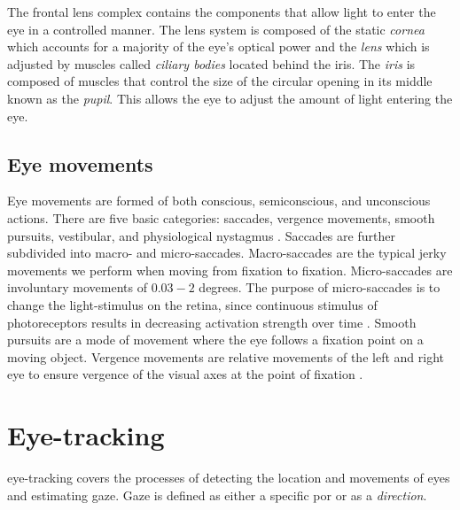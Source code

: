 The frontal lens complex contains the components that allow light to enter the eye in a controlled manner. The lens system is composed of the static \emph{cornea} which accounts for a majority of the eye's optical power and the \emph{lens} which is adjusted by muscles called \emph{ciliary bodies} located behind the iris. The \emph{iris} is composed of muscles that control the size of the circular opening in its middle known as the \emph{pupil}. This allows the eye to adjust the amount of light entering the eye. 

\subsection{Eye movements}
Eye movements are formed of both conscious, semiconscious, and unconscious actions. There are five basic categories: saccades, vergence movements, smooth pursuits, vestibular, and physiological nystagmus \parencite[39]{methodology}. Saccades are further subdivided into macro- and micro-saccades. Macro-saccades are the typical jerky movements we perform when moving from fixation to fixation. Micro-saccades are involuntary movements of $0.03-2$ degrees. The purpose of micro-saccades is to change the light-stimulus on the retina, since continuous stimulus of photoreceptors results in decreasing activation strength over time \parencite[44]{methodology}. Smooth pursuits are a mode of movement where the eye follows a fixation point on a moving object. Vergence movements are relative movements of the left and right eye to ensure vergence of the visual axes at the point of fixation \parencite{methodology}.


\section{Eye-tracking}\label{sec:eye-tracking}
\Gls{eye-tracking} covers the processes of detecting the location and movements of eyes and estimating \gls{gaze}. Gaze is defined as either a specific \acrfull{por} or as a \emph{direction}.

